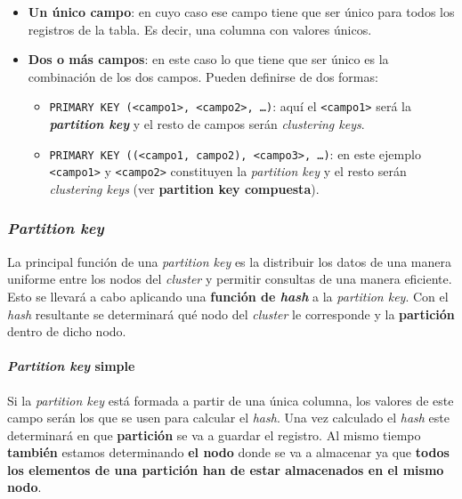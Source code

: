 \documentclass[
]{book}
\providecommand{\tightlist}{%
  \setlength{\itemsep}{0pt}\setlength{\parskip}{0pt}}
\begin{document}
\begin{itemize}
\tightlist
\item
  \textbf{Un único campo}: en cuyo caso ese campo tiene que ser único para todos los registros de la tabla. Es decir, una columna con valores únicos.
\item
  \textbf{Dos o más campos}: en este caso lo que tiene que ser único es la combinación de los dos campos. Pueden definirse de dos formas:

  \begin{itemize}
  \tightlist
  \item
    \texttt{PRIMARY\ KEY\ (\textless{}campo1\textgreater{},\ \textless{}campo2\textgreater{},\ …)}: aquí el \texttt{\textless{}campo1\textgreater{}} será la \textbf{\emph{partition key}} y el resto de campos serán \emph{clustering keys}.
  \item
    \texttt{PRIMARY\ KEY\ ((\textless{}campo1,\ campo2),\ \textless{}campo3\textgreater{},\ …)}: en este ejemplo \texttt{\textless{}campo1\textgreater{}} y \texttt{\textless{}campo2\textgreater{}} constituyen la \emph{partition key} y el resto serán \emph{clustering keys} (ver \textbf{partition key compuesta}).
  \end{itemize}
\end{itemize}

\subsubsection{\texorpdfstring{\emph{Partition key}}{Partition key}}\label{partition-key}

La principal función de una \emph{partition key} es la distribuir los datos de una manera uniforme entre los nodos del \emph{cluster} y permitir consultas de una manera eficiente. Esto se llevará a cabo aplicando una \textbf{función de \emph{hash}} a la \emph{partition key}. Con el \emph{hash} resultante se determinará qué nodo del \emph{cluster} le corresponde y la \textbf{partición} dentro de dicho nodo.

\paragraph{\texorpdfstring{\emph{Partition key} simple}{Partition key simple}}\label{partition-key-simple}

Si la \emph{partition key} está formada a partir de una única columna, los valores de este campo serán los que se usen para calcular el \emph{hash}. Una vez calculado el \emph{hash} este determinará en que \textbf{partición} se va a guardar el registro. Al mismo tiempo \textbf{también} estamos determinando \textbf{el nodo} donde se va a almacenar ya que \textbf{todos los elementos de una partición han de estar almacenados en el mismo nodo}.
\end{document}

